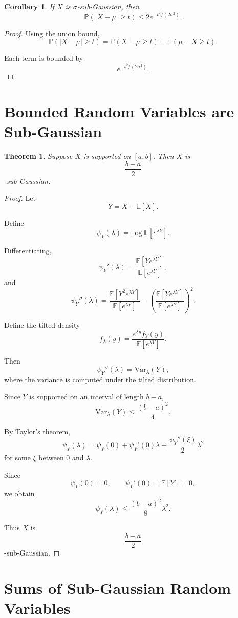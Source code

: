 \documentclass[12pt,oneside]{book}
\numberwithin{equation}{section}
\theoremstyle{definition}
\theoremstyle{plain}
\newtheorem{theorem}{Theorem}[section]
\newtheorem{corollary}{Corollary}[section]
\theoremstyle{remark}
\newcommand{\E}{\mathbb{E}}
\newcommand{\Var}{\mathrm{Var}}
\newcommand{\Prob}{\mathbb{P}}
\begin{document}
\begin{corollary}
If $X$ is $\sigma$-sub-Gaussian, then
\[
\Prob(|X-\mu|\geq t)
\leq
2e^{-t^2/(2\sigma^2)}.
\]
\end{corollary}

\begin{proof}
Using the union bound,
\[
\Prob(|X-\mu|\geq t)
=
\Prob(X-\mu\geq t)
+
\Prob(\mu-X\geq t).
\]

Each term is bounded by
\[
e^{-t^2/(2\sigma^2)}.
\]
\end{proof}

\section{Bounded Random Variables are Sub-Gaussian}

\begin{theorem}
Suppose $X$ is supported on $[a,b]$. Then $X$ is
\[
\frac{b-a}{2}
\]
-sub-Gaussian.
\end{theorem}

\begin{proof}
Let
\[
Y=X-\E[X].
\]

Define
\[
\psi_Y(\lambda)
=
\log\E[e^{\lambda Y}].
\]

Differentiating,
\[
\psi_Y'(\lambda)
=
\frac{\E[Ye^{\lambda Y}]}
{\E[e^{\lambda Y}]},
\]
and
\[
\psi_Y''(\lambda)
=
\frac{\E[Y^2e^{\lambda Y}]}
{\E[e^{\lambda Y}]}
-
\left(
\frac{\E[Ye^{\lambda Y}]}
{\E[e^{\lambda Y}]}
\right)^2.
\]

Define the tilted density
\[
f_\lambda(y)
=
\frac{e^{\lambda y}f_Y(y)}
{\E[e^{\lambda Y}]}.
\]

Then
\[
\psi_Y''(\lambda)
=
\Var_\lambda(Y),
\]
where the variance is computed under the tilted distribution.

Since $Y$ is supported on an interval of length $b-a$,
\[
\Var_\lambda(Y)
\leq
\frac{(b-a)^2}{4}.
\]

By Taylor's theorem,
\[
\psi_Y(\lambda)
=
\psi_Y(0)
+
\psi_Y'(0)\lambda
+
\frac{\psi_Y''(\xi)}{2}\lambda^2
\]
for some $\xi$ between $0$ and $\lambda$.

Since
\[
\psi_Y(0)=0,
\qquad
\psi_Y'(0)=\E[Y]=0,
\]
we obtain
\[
\psi_Y(\lambda)
\leq
\frac{(b-a)^2}{8}\lambda^2.
\]

Thus $X$ is
\[
\frac{b-a}{2}
\]
-sub-Gaussian.
\end{proof}

\section{Sums of Sub-Gaussian Random Variables}
\end{document}
